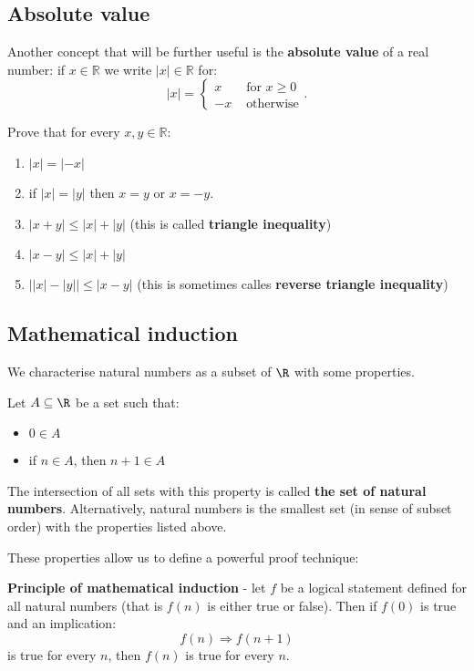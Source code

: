 \subsection{Absolute value}
Another concept that will be further useful is the \textbf{absolute value} of a real number:
if $x\in \mathbb R$ we write $|x|\in \mathbb R$ for:
$$|x| = \begin{cases}x &\text{ for } x \ge 0\\ -x &\text{ otherwise} \end{cases}.$$

\begin{exercise}
  Prove that for every $x,y\in \mathbb R$:
  \begin{enumerate}
    \item $|x|=|-x|$
    \item if $|x|=|y|$ then $x=y$ or $x=-y$.
    \item $|x+y| \le |x| + |y|$ (this is called \textbf{triangle inequality})
    \item $|x-y|\le |x| + |y|$
    \item $\left||x| - |y|\right|\le |x-y|$ (this is sometimes calles \textbf{reverse triangle inequality})
  \end{enumerate}
\end{exercise}

\subsection{Mathematical induction}
We characterise natural numbers as a subset of $\R$ with some properties.

\begin{definition}
  Let $A\subseteq \R$ be a set such that:
  \begin{itemize}
    \item $0\in A$
    \item if $n\in A$, then $n+1\in A$
  \end{itemize}
  The intersection of all sets with this property is called \textbf{the set of natural numbers}. Alternatively, natural numbers is the smallest set (in sense of subset order)
  with the properties listed above.
\end{definition}

These properties allow us to define a powerful proof technique:

\begin{definition}
  \textbf{Principle of mathematical induction} -
  let $f$ be a logical statement defined for all natural numbers (that is $f(n)$ is either true or false). Then if $f(0)$ is true and an implication:
  $$f(n)\Rightarrow f(n+1)$$
  is true for every $n$, then $f(n)$ is true for every $n$.
\end{definition}

